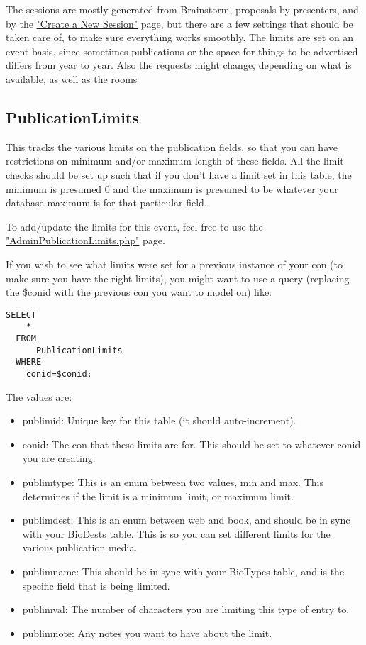 \documentclass[captions=tablesignature]{scrartcl}
\begin{document}
The sessions are mostly generated from Brainstorm, proposals by
presenters, and by the \href{../webpages/CreateSession.php}{"Create a New Session"} page, but there are a
few settings that should be taken care of, to make sure everything
works smoothly.  The limits are set on an event basis, since
sometimes publications or the space for things to be advertised
differs from year to year.  Also the requests might change,
depending on what is available, as well as the rooms
\subsection{PublicationLimits}
\label{sec-13-1}

This tracks the various limits on the publication fields, so that
you can have restrictions on minimum and/or maximum length of these
fields.  All the limit checks should be set up such that if you
don't have a limit set in this table, the minimum is presumed 0 and
the maximum is presumed to be whatever your database maximum is for
that particular field.  

To add/update the limits for this event, feel free to use the
\href{../webpages/AdminPublicationLimits.php}{"AdminPublicationLimits.php"} page.

If you wish to see what limits were set for a previous instance of
your con (to make sure you have the right limits), you might want
to use a query (replacing the \$conid with the previous con you want
to model on) like:
\begin{verbatim}
SELECT
    *
  FROM
      PublicationLimits
  WHERE
    conid=$conid;
\end{verbatim}
The values are:
\begin{itemize}
\item publimid: Unique key for this table (it should auto-increment).
\item conid: The con that these limits are for.  This should be set to
whatever conid you are creating.
\item publimtype: This is an enum between two values, min and max.
This determines if the limit is a minimum limit, or maximum
limit.
\item publimdest: This is an enum between web and book, and should be
in sync with your BioDests table.  This is so you can set
different limits for the various publication media.
\item publimname: This should be in sync with your BioTypes table, and
is the specific field that is being limited.
\item publimval: The number of characters you are limiting this type of
entry to.
\item publimnote: Any notes you want to have about the limit.
\end{itemize}
\end{document}
